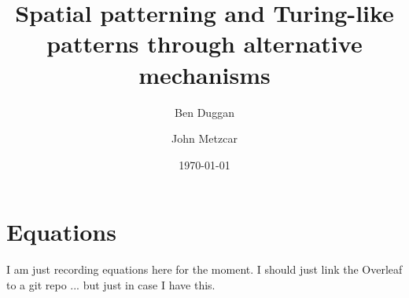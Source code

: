 \documentclass{article}
\begin{document}
\title{Spatial patterning and Turing-like patterns through alternative mechanisms}

\date{\today}


\author[1]{Ben Duggan}
\author[2]{John Metzcar}



%

\maketitle

\section{Equations}

I am just recording equations here for the moment. I should just link the Overleaf to a git repo ... but just in case I have this. 

\printbibliography



%
%
\end{document}
